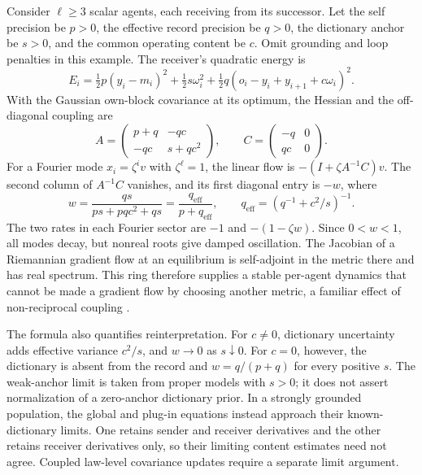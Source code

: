 Consider $\ell\geq3$ scalar agents, each receiving from its successor. Let the self precision be $p>0$, the effective record precision be $q>0$, the dictionary anchor be $s>0$, and the common operating content be $c$. Omit grounding and loop penalties in this example. The receiver's quadratic energy is
\begin{equation}
 E_i=\tfrac12p(y_i-m_i)^2+\tfrac12s\omega_i^2
      +\tfrac12q(o_i-y_i+y_{i+1}+c\omega_i)^2.
 \label{c18:ring-energy}
\end{equation}
With the Gaussian own-block covariance at its optimum, the Hessian and the off-diagonal coupling are
\begin{equation}
 A=\begin{pmatrix}p+q&-qc\\-qc&s+qc^2\end{pmatrix},
 \qquad C=\begin{pmatrix}-q&0\\qc&0\end{pmatrix}.
 \label{c18:ring-blocks}
\end{equation}
For a Fourier mode $x_i=\zeta^iv$ with $\zeta^\ell=1$, the linear flow is $-(I+\zeta A^{-1}C)v$. The second column of $A^{-1}C$ vanishes, and its first diagonal entry is $-w$, where
\begin{equation}
 w=\frac{qs}{ps+pqc^2+qs}
   =\frac{q_{\mathrm{eff}}}{p+q_{\mathrm{eff}}},
 \qquad q_{\mathrm{eff}}=(q^{-1}+c^2/s)^{-1}.
 \label{c18:ring-coupling}
\end{equation}
The two rates in each Fourier sector are $-1$ and $-(1-\zeta w)$. Since $0<w<1$, all modes decay, but nonreal roots give damped oscillation. The Jacobian of a Riemannian gradient flow at an equilibrium is self-adjoint in the metric there and has real spectrum. This ring therefore supplies a stable per-agent dynamics that cannot be made a gradient flow by choosing another metric, a familiar effect of non-reciprocal coupling \citep{FruchartEtAl2021}.

The formula also quantifies reinterpretation. For $c\neq0$, dictionary uncertainty adds effective variance $c^2/s$, and $w\to0$ as $s\downarrow0$. For $c=0$, however, the dictionary is absent from the record and $w=q/(p+q)$ for every positive $s$. The weak-anchor limit is taken from proper models with $s>0$; it does not assert normalization of a zero-anchor dictionary prior. In a strongly grounded population, the global and plug-in equations instead approach their known-dictionary limits. One retains sender and receiver derivatives and the other retains receiver derivatives only, so their limiting content estimates need not agree. Coupled law-level covariance updates require a separate limit argument.

